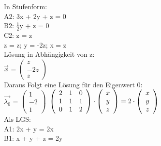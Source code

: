 \documentclass{article}
\begin{document}
	In Stufenform: \\
	A2: 3x + 2y + z = 0 \\
	B2: $\frac{1}{2}$y + z = 0 \\
	C2: z = z \\
	z = z; y = -2z; x = z \\
	Lösung in Abhängigkeit von z: \\
	$\vec{x}$ = 
	$\left(
	\begin{array}{c}
	z\\-2z\\z
	\end{array}
	\right)$
	\\
	Daraus Folgt eine Lösung für den Eigenwert 0: \\
	$\vec{\lambda_{0}}$ =
	$\left(
	\begin{array}{c}
	1 \\ -2 \\ 1
	\end{array}
	\right)$
	$ \\ \\
	\left(
	\begin{array}{ccc}
	2&1&0 \\ 1&1&1 \\ 0&1&2 
	\end{array}
	\right)
	\cdot
	\left(
	\begin{array}{c}
	x \\ y \\ z
	\end{array}
	\right)
	=
	2 \cdot
	\left(
	\begin{array}{c}
	x \\ y \\ z
	\end{array}
	\right)
	$ \\
	Als LGS: \\
	A1: 2x + y = 2x \\
	B1: x + y + z = 2y \\
	
\end{document}
